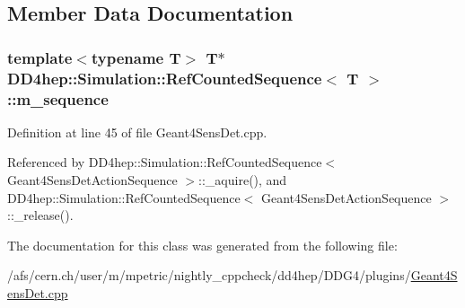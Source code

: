 \subsection{Member Data Documentation}
\hypertarget{class_d_d4hep_1_1_simulation_1_1_ref_counted_sequence_a8fb29db1af39af7f025ed8d1b20b6dfe}{
\subsubsection[{m\_\-sequence}]{\setlength{\rightskip}{0pt plus 5cm}template$<$typename T$>$ {\bf T}$\ast$ {\bf DD4hep::Simulation::RefCountedSequence}$<$ {\bf T} $>$::{\bf m\_\-sequence}}}
\label{class_d_d4hep_1_1_simulation_1_1_ref_counted_sequence_a8fb29db1af39af7f025ed8d1b20b6dfe}


Definition at line 45 of file Geant4SensDet.cpp.

Referenced by DD4hep::Simulation::RefCountedSequence$<$ Geant4SensDetActionSequence $>$::\_\-aquire(), and DD4hep::Simulation::RefCountedSequence$<$ Geant4SensDetActionSequence $>$::\_\-release().

The documentation for this class was generated from the following file:\begin{DoxyCompactItemize}
\item 
/afs/cern.ch/user/m/mpetric/nightly\_\-cppcheck/dd4hep/DDG4/plugins/\hyperlink{_geant4_sens_det_8cpp}{Geant4SensDet.cpp}\end{DoxyCompactItemize}
